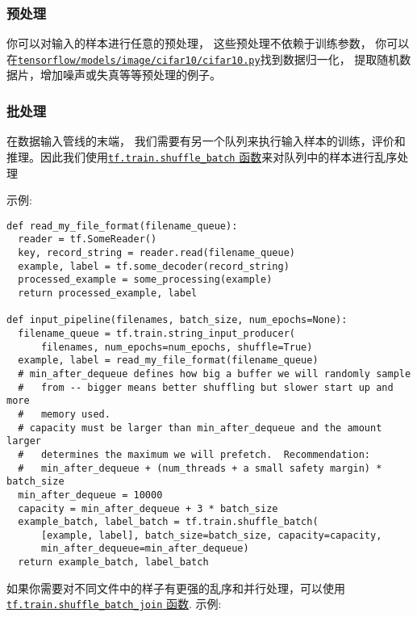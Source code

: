 \subsubsection{预处理 }\label{ux9884ux5904ux7406}

你可以对输入的样本进行任意的预处理， 这些预处理不依赖于训练参数，
你可以在\href{https://tensorflow.googlesource.com/tensorflow/+/master/tensorflow/models/image/cifar10/cifar10.py}{\texttt{tensorflow/models/image/cifar10/cifar10.py}}找到数据归一化，
提取随机数据片，增加噪声或失真等等预处理的例子。

\subsubsection{批处理 }\label{ux6279ux5904ux7406}

在数据输入管线的末端，
我们需要有另一个队列来执行输入样本的训练，评价和推理。因此我们使用\href{tensorflow-zh/SOURCE/api_docs/python/io_ops.md\#shuffle_batch}{\texttt{tf.train.shuffle\_batch}
函数}来对队列中的样本进行乱序处理

示例:

\begin{verbatim}
def read_my_file_format(filename_queue):
  reader = tf.SomeReader()
  key, record_string = reader.read(filename_queue)
  example, label = tf.some_decoder(record_string)
  processed_example = some_processing(example)
  return processed_example, label

def input_pipeline(filenames, batch_size, num_epochs=None):
  filename_queue = tf.train.string_input_producer(
      filenames, num_epochs=num_epochs, shuffle=True)
  example, label = read_my_file_format(filename_queue)
  # min_after_dequeue defines how big a buffer we will randomly sample
  #   from -- bigger means better shuffling but slower start up and more
  #   memory used.
  # capacity must be larger than min_after_dequeue and the amount larger
  #   determines the maximum we will prefetch.  Recommendation:
  #   min_after_dequeue + (num_threads + a small safety margin) * batch_size
  min_after_dequeue = 10000
  capacity = min_after_dequeue + 3 * batch_size
  example_batch, label_batch = tf.train.shuffle_batch(
      [example, label], batch_size=batch_size, capacity=capacity,
      min_after_dequeue=min_after_dequeue)
  return example_batch, label_batch
\end{verbatim}

如果你需要对不同文件中的样子有更强的乱序和并行处理，可以使用\href{tensorflow-zh/SOURCE/api_docs/python/io_ops.md\#shuffle_batch_join}{\texttt{tf.train.shuffle\_batch\_join}
函数}. 示例:

